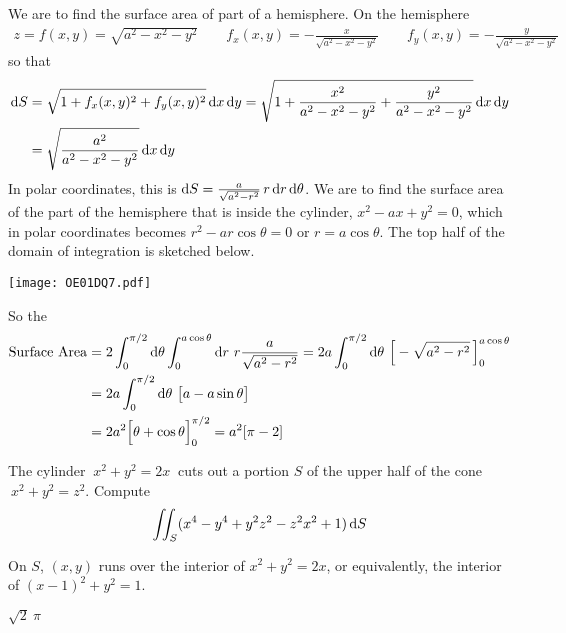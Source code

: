 \begin{solution}
We are to find the surface area of part of a hemisphere. On the hemisphere 
\begin{align*}
z=f(x,y)=\sqrt{a^2-x^2-y^2}\qquad 
f_x(x,y)=-\frac{x}{\sqrt{a^2-x^2-y^2}}\qquad
f_y(x,y)=-\frac{y}{\sqrt{a^2-x^2-y^2}}
\end{align*}
so that
\begin{align*}
\mathrm{d}S&=\sqrt{1+f_x(x,y)^2+f_y(x,y)^2}\,\mathrm{d}x\,\mathrm{d}y
=\sqrt{1+\frac{x^2}{a^2-x^2-y^2}+\frac{y^2}{a^2-x^2-y^2}}\,\mathrm{d}x\,\mathrm{d}y \\
&=\sqrt{\frac{a^2}{a^2-x^2-y^2}}\,\mathrm{d}x\,\mathrm{d}y
\end{align*}
In polar coordinates, this is $\mathrm{d}S=\frac{a}{\sqrt{a^2-r^2}}\,r\,\mathrm{d}r\,\mathrm{d}\theta$.
We are to find the surface area of the part of the hemisphere that is 
inside the cylinder, $x^2-ax+y^2=0$, which in polar coordinates
becomes $r^2-ar\cos\theta=0$ or $r=a\cos\theta$. The top half of the domain of
integration is sketched below.  
\begin{center}
     \texttt{[image: OE01DQ7.pdf]}
\end{center}
So the
\begin{align*}
{\rm Surface\ Area}
&= 2\int_0^{\pi/2}\dee{\theta}\int_0^{a\cos\theta}\dee{r}\ r
                                      \frac{a}{\sqrt{a^2-r^2}}
= 2a\int_0^{\pi/2}\dee{\theta}\ \Big[-\sqrt{a^2-r^2}\,\Big]_0^{a\cos\theta}
\\
&= 2a\int_0^{\pi/2}\dee{\theta}\ \big[a-a\sin\theta\big] \\
&= 2a^2\Big[\theta+\cos\theta\Big]_0^{\pi/2}
=a^2[\pi-2]
\end{align*}
\end{solution}




\begin{question}
The cylinder $\ x^2+y^2=2x\ $ cuts out a portion 
$S$ of the upper half of the cone $\ x^2+y^2=z^2$. Compute
\begin{equation*}
\iint_S(x^4-y^4+y^2z^2-z^2x^2+1)\,\mathrm{d}S
\end{equation*}
\end{question}

\begin{hint} 
On $S$, $(x,y)$ runs over the interior of $x^2+y^2=2x$,
or equivalently, the interior of $(x-1)^2+y^2=1$.
\end{hint}

\begin{answer} 
$\sqrt{2}\ \pi$
\end{answer}

